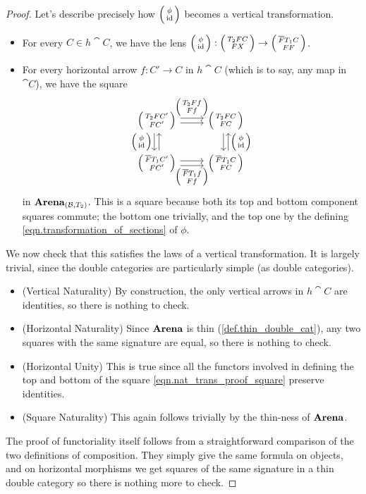 \documentclass[DynamicalBook]{subfiles}
\begin{document}
\begin{proof}
Let's describe precisely how $\lens{\phi}{\id}$ becomes a vertical
transformation.
\begin{itemize}
  \item For every $C \in h\cat{C}$, we have the lens $\lens{\phi}{\id} :
    \lens{T_2 FC}{F X}  \to \lens{\overline{F}T_1 C}{F F}$.
  \item For every horizontal arrow $f : C' \to C$ in $h\cat{C}$ (which is to
    say, any map in $\cat{C}$), we have the square
    \begin{equation}\label{eqn.nat_trans_proof_square}
  \begin{tikzcd}
    \lens{T_2FC'}{FC'} \ar[r, shift left, "{\lens{T_2 Ff}{Ff}}"] \ar[r, shift right] \ar[d, shift right,
    "{\lens{\phi}{\id}}"'] \ar[d, shift left, leftarrow] &
    \lens{T_2FC}{FC} \ar[d, shift left, leftarrow,
    "{\lens{\phi}{\id}}"] \ar[d, shift right]\\
    \lens{\overline{F}T_1 C'}{FC'} \ar[r, shift right, "{\lens{\overline{F}T_1f}{Ff}}"']
    \ar[r, shift left] & \lens{\overline{F}T_1C}{FC}
  \end{tikzcd}
  \end{equation}
in $\textbf{Arena}_{(\mathcal{B}, T_2)}$. This is a square because both its top and
bottom component squares commute; the bottom one trivially, and the top one by
the defining \cref{eqn.transformation_of_sections} of $\phi$.
\end{itemize}
We now check that this satisfies the laws of a vertical transformation. It is
largely trivial, since the double categories are particularly simple (as double categories).
\begin{itemize}
  \item (Vertical Naturality) By construction, the only vertical arrows in
    $h\cat{C}$ are identities, so there is nothing to check.
  \item (Horizontal Naturality) Since $\textbf{Arena}$ is thin
    (\cref{def.thin_double_cat}), any two squares with the same signature are
    equal, so there is nothing to check.
  \item (Horizontal Unity) This is true since all the functors involved in
    defining the top and bottom of the square \cref{eqn.nat_trans_proof_square}
    preserve identities.
  \item (Square Naturality) This again follows trivially by the thin-ness of $\textbf{Arena}$.
\end{itemize}

The proof of functoriality itself follows from a straightforward comparison of
the two definitions of composition. They simply give the same formula on
objects, and on horizontal morphisms we get squares of the same signature in a
thin double category so there is nothing more to check.
\end{proof}
\end{document}
